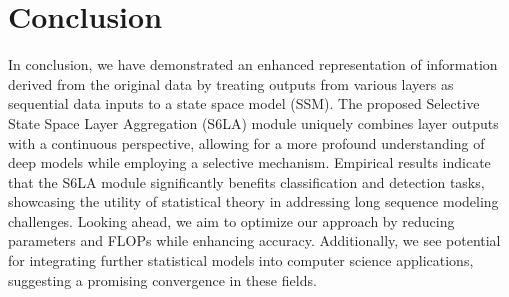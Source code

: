 \section{Conclusion}


In conclusion, we have demonstrated an enhanced representation of information derived from the original data by treating outputs from various layers as sequential data inputs to a state space model (SSM). The proposed Selective State Space Layer Aggregation (S6LA) module uniquely combines layer outputs with a continuous perspective, allowing for a more profound understanding of deep models while employing a selective mechanism. Empirical results indicate that the S6LA module significantly benefits classification and detection tasks, showcasing the utility of statistical theory in addressing long sequence modeling challenges. Looking ahead, we aim to optimize our approach by reducing parameters and FLOPs while enhancing accuracy. Additionally, we see potential for integrating further statistical models into computer science applications, suggesting a promising convergence in these fields.

